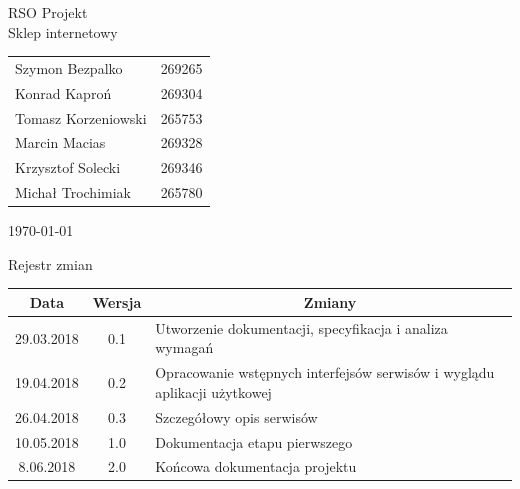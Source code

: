 \documentclass[11pt,a4paper,twoside]{article}
\begin{document}
\begin{center}
\vspace*{3\baselineskip}
{\LARGE{RSO Projekt}}
\\
\vspace*{2\baselineskip}
{\Large{Sklep internetowy}}
\\
\vspace*{2\baselineskip}
\begin{table}[ht]
\label{autors}
\centering
\begin{tabular}{ll}
	Szymon Bezpalko & 269265\\
	Konrad Kaproń & 269304\\
	Tomasz Korzeniowski & 265753\\
	Marcin Macias & 269328\\
	Krzysztof Solecki & 269346\\
	Michał Trochimiak & 265780\\
\end{tabular}
\end{table}

\vspace*{2\baselineskip}
\today
\end{center}
\vspace*{3\baselineskip}
\begin{center}
Rejestr zmian
\end{center}

\begin{table}[ht]
\label{changelog}
\centering
\begin{tabular}{|c|c|l|}
\hline
 Data & Wersja & \multicolumn{1}{c|}{Zmiany} \\\hline
 29.03.2018 & 0.1 & Utworzenie dokumentacji, specyfikacja i analiza wymagań \\\hline
 19.04.2018 & 0.2 & Opracowanie wstępnych interfejsów serwisów i wyglądu aplikacji użytkowej \\\hline
 26.04.2018 & 0.3 & Szczegółowy opis serwisów \\\hline
 10.05.2018 & 1.0 & Dokumentacja etapu pierwszego\\\hline
 8.06.2018 & 2.0 & Końcowa dokumentacja projektu \\\hline
\end{tabular}
\end{table}
\newpage
\tableofcontents
\end{document}
